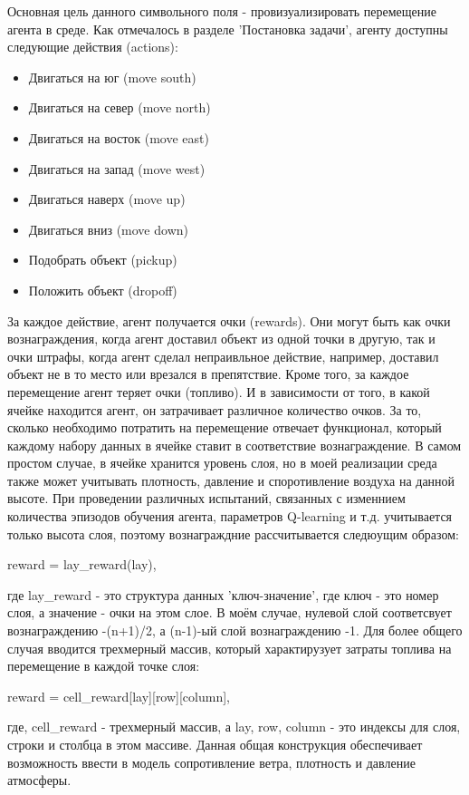 \documentclass[a4paper]{report}
\theoremstyle{definition}
\theoremstyle{plain}
\theoremstyle{remark}
\theoremstyle{remark}
\theoremstyle{definition}
\begin{document}
Основная цель данного символьного поля - провизуализировать перемещение агента в среде. Как отмечалось в разделе 'Постановка задачи', агенту доступны следующие действия (actions):
\begin{itemize}
\item Двигаться на юг (move south)
\item Двигаться на север (move north)
\item Двигаться на восток (move east)
\item Двигаться на запад (move west)
\item Двигаться наверх (move up)
\item Двигаться вниз (move down)
\item Подобрать объект (pickup)
\item Положить объект (dropoff)
 \end{itemize}

За каждое действие, агент получается очки (rewards). Они могут быть как очки вознаграждения, когда агент доставил объект из одной точки в другую, так и очки штрафы, когда агент сделал непраивльное действие, например, доставил объект не в то место или врезался в препятствие. Кроме того, за каждое перемещение агент теряет очки (топливо). И в зависимости от того, в какой ячейке находится агент, он затрачивает различное количество очков. За то, сколько необходимо потратить на перемещение отвечает функционал, который каждому набору данных в ячейке ставит в соответствие вознаграждение. В самом простом случае, в ячейке хранится уровень слоя, но в моей реализации среда также может учитывать плотность, давление и споротивление воздуха на данной высоте. При проведении различных испытаний, связанных с изменнием количества эпизодов обучения агента, параметров Q-learning и т.д. учитывается только высота слоя, поэтому вознаграждние рассчитывается следюущим образом:
\begin{center}
    reward = lay\_reward(lay),
\end{center}
где lay\_reward - это структура данных 'ключ-значение', где ключ - это номер слоя, а значение - очки на этом слое. В моём случае, нулевой слой соответсвует вознаграждению -(n+1)/2, а (n-1)-ый слой вознаграждению -1. Для более общего случая вводится трехмерный массив, который характирузует затраты топлива на перемещение в каждой точке слоя:
\begin{center}
    reward = cell\_reward[lay][row][column],
\end{center}
где, cell\_reward - трехмерный массив, а lay, row, column - это индексы для слоя, строки и столбца в этом массиве. Данная общая конструкция обеспечивает возможность ввести в модель сопротивление ветра, плотность и давление атмосферы.
\end{document}
